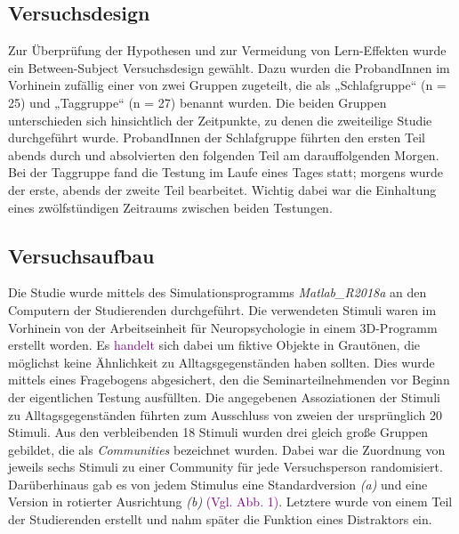 \subsection{Versuchsdesign}
Zur Überprüfung der Hypothesen und zur Vermeidung von Lern-Effekten wurde ein Between-Subject Versuchsdesign gewählt. Dazu wurden die ProbandInnen im Vorhinein zufällig einer von zwei Gruppen zugeteilt, die als „Schlafgruppe“ (n = 25) und „Taggruppe“ (n = 27) benannt wurden. Die beiden Gruppen unterschieden sich hinsichtlich der Zeitpunkte, zu denen die zweiteilige Studie durchgeführt wurde. ProbandInnen der Schlafgruppe führten den ersten Teil abends durch und absolvierten den folgenden Teil am darauffolgenden Morgen. Bei der Taggruppe fand die Testung im Laufe eines Tages statt; morgens wurde der erste, abends der zweite Teil bearbeitet. Wichtig dabei war die Einhaltung eines zwölfstündigen Zeitraums zwischen beiden Testungen.

\subsection{Versuchsaufbau}
Die Studie wurde mittels des Simulationsprogramms \textit{Matlab\_R2018a} an den Computern der Studierenden durchgeführt. Die verwendeten Stimuli waren im Vorhinein von der Arbeitseinheit für Neuropsychologie in einem 3D-Programm  erstellt worden. Es \textcolor{purple}{handelt} sich dabei um fiktive Objekte in Grautönen, die möglichst keine Ähnlichkeit zu Alltagsgegenständen haben sollten. Dies wurde mittels eines Fragebogens abgesichert, den die Seminarteilnehmenden vor Beginn der eigentlichen Testung ausfüllten. Die angegebenen Assoziationen der Stimuli zu Alltagsgegenständen führten zum Ausschluss von zweien der ursprünglich 20 Stimuli.
Aus den verbleibenden 18 Stimuli wurden drei gleich große Gruppen gebildet, die als \textit{Communities} bezeichnet wurden. Dabei war die Zuordnung von jeweils sechs Stimuli zu einer Community für jede Versuchsperson randomisiert.
Darüberhinaus gab es von jedem Stimulus eine Standardversion \textit{(a)} und eine Version in rotierter Ausrichtung \textit{(b)} \textcolor{purple}{(Vgl. Abb. 1)}. Letztere wurde von einem Teil der Studierenden erstellt und nahm später die Funktion eines Distraktors ein.


